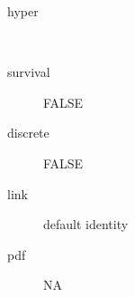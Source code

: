 \begin{description}
	\item[hyper]\ 
	 \item[ survival ] FALSE 
	 \item[ discrete ] FALSE 
	 \item[ link ] default identity 
	 \item[ pdf ] NA 
\end{description}

